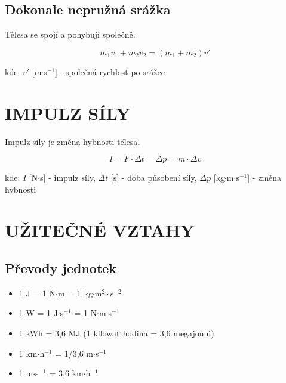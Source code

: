 \documentclass[a4paper,11pt]{article}
\begin{document}
\subsection{Dokonale nepružná srážka}

\begin{definitionbox}
Tělesa se spojí a pohybují společně.
\end{definitionbox}

\begin{equationbox}
\begin{equation*}
    m_1v_1 + m_2v_2 = (m_1 + m_2)v'
\end{equation*}
\end{equationbox}

\begin{notebox}
kde: $v'$ [m$\cdot$s$^{-1}$] - společná rychlost po srážce
\end{notebox}

\newpage

\section{IMPULZ SÍLY}

\begin{definitionbox}
Impulz síly je změna hybnosti tělesa.
\end{definitionbox}

\begin{equationbox}
\begin{equation*}
    I = F \cdot \Delta t = \Delta p = m \cdot \Delta v
\end{equation*}
\end{equationbox}

\begin{notebox}
kde: $I$ [N$\cdot$s] - impulz síly, $\Delta t$ [s] - doba působení síly, $\Delta p$ [kg$\cdot$m$\cdot$s$^{-1}$] - změna hybnosti
\end{notebox}

\section{UŽITEČNÉ VZTAHY}

\subsection{Převody jednotek}

\begin{notebox}
\begin{itemize}
    \item 1 J = 1 N$\cdot$m = 1 kg$\cdot$m$^2\cdot$s$^{-2}$
    \item 1 W = 1 J$\cdot$s$^{-1}$ = 1 N$\cdot$m$\cdot$s$^{-1}$
    \item 1 kWh = 3,6 MJ (1 kilowatthodina = 3,6 megajoulů)
    \item 1 km$\cdot$h$^{-1}$ = 1/3,6 m$\cdot$s$^{-1}$
    \item 1 m$\cdot$s$^{-1}$ = 3,6 km$\cdot$h$^{-1}$
\end{itemize}
\end{notebox}
\end{document}
